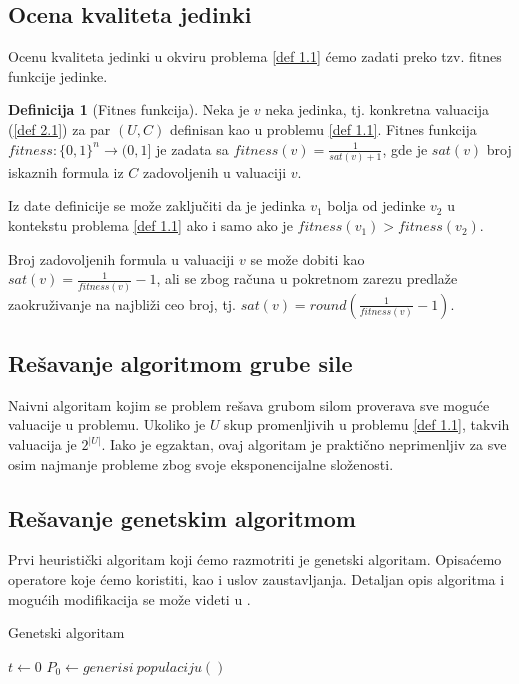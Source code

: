 \documentclass[12pt, a4paper]{article}
\theoremstyle{definition}
\newtheorem{definition}{Definicija}[section]
\begin{document}
\subsection{Ocena kvaliteta jedinki}

Ocenu kvaliteta jedinki u okviru problema \ref{def 1.1} ćemo zadati preko tzv. fitnes funkcije jedinke.

\begin{definition}[Fitnes funkcija]
\label{def 2.2}
Neka je $v$ neka jedinka, tj. konkretna valuacija (\ref{def 2.1}) za par $(U, C)$ definisan kao u problemu \ref{def 1.1}. Fitnes funkcija $fitness : \{0, 1\}^n \rightarrow (0, 1]$ je zadata sa $fitness(v) = \frac{1}{sat(v) + 1}$, gde je $sat(v)$ broj iskaznih formula iz $C$ zadovoljenih u valuaciji $v$.
\end{definition}

Iz date definicije se može zaključiti da je jedinka $v_1$ bolja od jedinke $v_2$ u kontekstu problema \ref{def 1.1} ako i samo ako je $fitness(v_1) > fitness(v_2)$.

Broj zadovoljenih formula u valuaciji $v$ se može dobiti kao $sat(v) = \frac{1}{fitness(v)} - 1$, ali se zbog računa u pokretnom zarezu predlaže zaokruživanje na najbliži ceo broj, tj.
$sat(v) = round(\frac{1}{fitness(v)} - 1)$.

\subsection{Rešavanje algoritmom grube sile}

Naivni algoritam kojim se problem rešava grubom silom proverava sve moguće valuacije u problemu. Ukoliko je $U$ skup promenljivih u problemu \ref{def 1.1}, takvih valuacija je $2^{|U|}$. Iako je egzaktan, ovaj algoritam je praktično neprimenljiv za sve osim najmanje probleme zbog svoje eksponencijalne složenosti.

\subsection{Rešavanje genetskim algoritmom}

Prvi heuristički algoritam koji ćemo razmotriti je genetski algoritam. Opisaćemo operatore koje ćemo koristiti, kao i uslov zaustavljanja. Detaljan opis algoritma i mogućih modifikacija se može videti u \cite{3}.

\begin{algorithm}
\caption{Genetski algoritam}
\label{alg:1}
$t \gets 0$\;
$P_0 \gets generisi\ populaciju()$\;
\end{algorithm}
\end{document}

